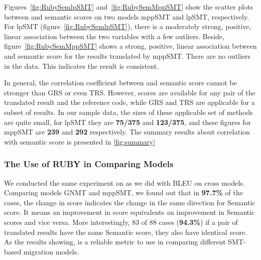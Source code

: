 Figures~\ref{fig:RubySemlpSMT} and~\ref{fig:RubySemMppSMT} show the
scatter plots between {\model} and semantic scores on two models mppSMT
and lpSMT, respectively. For lpSMT (figure~\ref{fig:RubySemlpSMT}), 
there is a moderately strong, positive, linear association between the 
two variables with a few outliers. Beside, figure~\ref{fig:RubySemMppSMT} 
shows a strong, positive, linear association between {\model} and semantic 
score for the results translated by mppSMT. There are no outliers in the data. 
This indicates the result is consistent.


In general, the correlation coefficient between {\model} and semantic score cannot be 
stronger than GRS or even TRS. However, {\model} scores are available for any pair 
of the translated result and the reference code, while GRS and TRS are applicable for 
a subset of results. In our sample data, the sizes of these applicable set of methods
are quite small, for lpSMT they are \textbf{75/375} and \textbf{123/375}, and these figures
for mppSMT are \textbf{239} and \textbf{292} respectively. The summary results about correlation with semantic score is presented in \ref{fig:summary}


	    
\subsubsection{The Use of RUBY in Comparing Models}
We conducted the same experiment on {\model} as we did with BLEU on cross models. 
Comparing models GNMT and mppSMT, we found out that in \textbf{97.7\%} of the cases, the change in {\model} score indicates the change in the same direction for Semantic score. It means an improvement in {\model} score equivalents an improvement in Semantic scores and vice versa. More interestingly, 83 of 88 cases (\textbf{94.3\%}) if a pair of translated results have the same Semantic score, they also have identical {\model} score. 
As the results showing, {\model} is a reliable metric to use in comparing different SMT-based migration models. 	

